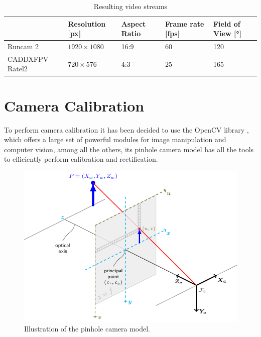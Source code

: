 \begin{table}[h]
\centering
\caption{Resulting video streams}
\label{tab:cam_table}
\begin{tabular}{l|l|l|l|l|}
  \cline{2-5}
                                        & \cellcolor[HTML]{C0C0C0}Resolution {[}px{]} & \cellcolor[HTML]{C0C0C0}Aspect Ratio & \cellcolor[HTML]{C0C0C0}Frame rate {[}fps{]} & \cellcolor[HTML]{C0C0C0}Field of View {[}°{]} \\ \hline
  \multicolumn{1}{|l|}{Runcam 2}        &  \(1920\times1080\)                                   & 16:9                                 & 60                                           & 120                                           \\ \hline
  \multicolumn{1}{|l|}{CADDXFPV Ratel2} &  \(720\times576\)                                     & 4:3                                  & 25                                           & 165                                           \\ \hline
  \end{tabular}
\end{table}





\section {Camera Calibration}
\label{sec:camera_calib}

To perform camera calibration it has been decided to use the OpenCV library \cite{opencv}, which offers a large set of powerful modules for image manipulation and computer vision, among all the others, its pinhole camera model has all the tools to efficiently perform calibration and rectification.

\begin{figure}[h]
  \centering
  \includegraphics[scale=0.3]{figures/pinhole.png}
  \caption{Illustration of the pinhole camera model.}
  \label{img:pinhole_img}
\end{figure}

